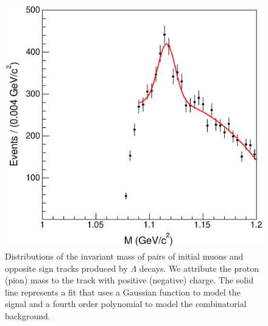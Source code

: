 \documentclass[aps,prd,preprint,floatfix,nofootinbib,superscriptaddress,showpacs,amssymb]{revtex4}
\begin{document}
 \begin{figure}[]
 \begin{center}
 \vspace{-0.2in}
 \leavevmode
 \includegraphics*[width=\textwidth]{fa0_lambda.eps}
 \caption[]{Distributions of  the invariant mass of pairs of initial
            muons and opposite sign tracks produced by $\Lambda$ decays.
            We attribute the proton (pion) mass to the track with positive 
            (negative) charge. The solid line represents a fit that uses
            a Gaussian function to model the signal and a fourth order
            polynomial to model the combinatorial background.}
 \label{fig:fig_lam}
 \end{center}
 \end{figure}
\end{document}
